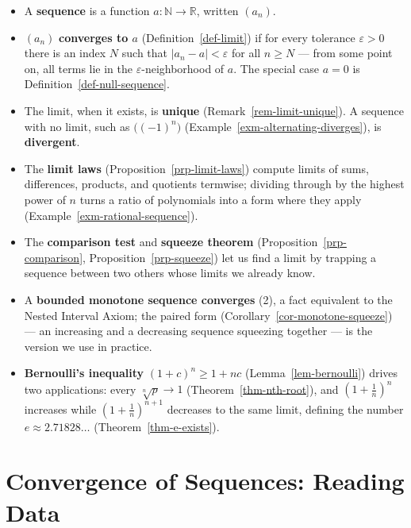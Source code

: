 \documentclass[
  letterpaper,
  DIV=11,
  numbers=noendperiod]{scrreprt}
\providecommand{\tightlist}{%
  \setlength{\itemsep}{0pt}\setlength{\parskip}{0pt}}
\theoremstyle{plain}
\theoremstyle{plain}
\theoremstyle{definition}
\theoremstyle{definition}
\theoremstyle{definition}
\theoremstyle{plain}
\theoremstyle{plain}
\theoremstyle{remark}
\begin{document}
\begin{itemize}
\tightlist
\item
  A \textbf{sequence} is a function \(a\colon\mathbb{N}\to\mathbb{R}\),
  written \((a_n)\).
\item
  \((a_n)\) \textbf{converges to \(a\)} (Definition~\ref{def-limit}) if
  for every tolerance \(\varepsilon>0\) there is an index \(N\) such
  that \(\lvert a_n - a \rvert < \varepsilon\) for all \(n\ge N\) ---
  from some point on, all terms lie in the \(\varepsilon\)-neighborhood
  of \(a\). The special case \(a=0\) is
  Definition~\ref{def-null-sequence}.
\item
  The limit, when it exists, is \textbf{unique}
  (Remark~\ref{rem-limit-unique}). A sequence with no limit, such as
  \(\big((-1)^n\big)\) (Example~\ref{exm-alternating-diverges}), is
  \textbf{divergent}.
\item
  The \textbf{limit laws} (Proposition~\ref{prp-limit-laws}) compute
  limits of sums, differences, products, and quotients termwise;
  dividing through by the highest power of \(n\) turns a ratio of
  polynomials into a form where they apply
  (Example~\ref{exm-rational-sequence}).
\item
  The \textbf{comparison test} and \textbf{squeeze theorem}
  (Proposition~\ref{prp-comparison}, Proposition~\ref{prp-squeeze}) let
  us find a limit by trapping a sequence between two others whose limits
  we already know.
\item
  A \textbf{bounded monotone sequence converges} (2), a fact equivalent
  to the Nested Interval Axiom; the paired form
  (Corollary~\ref{cor-monotone-squeeze}) --- an increasing and a
  decreasing sequence squeezing together --- is the version we use in
  practice.
\item
  \textbf{Bernoulli's inequality} \((1+c)^n \ge 1+nc\)
  (Lemma~\ref{lem-bernoulli}) drives two applications: every
  \(\sqrt[n]{p} \to 1\) (Theorem~\ref{thm-nth-root}), and
  \(\left(1+\tfrac1n\right)^n\) increases while
  \(\left(1+\tfrac1n\right)^{n+1}\) decreases to the same limit,
  defining the number \(e\approx2.71828\ldots\)
  (Theorem~\ref{thm-e-exists}).
\end{itemize}

\chapter{Convergence of Sequences: Reading
Data}\label{convergence-of-sequences-reading-data}
\end{document}
